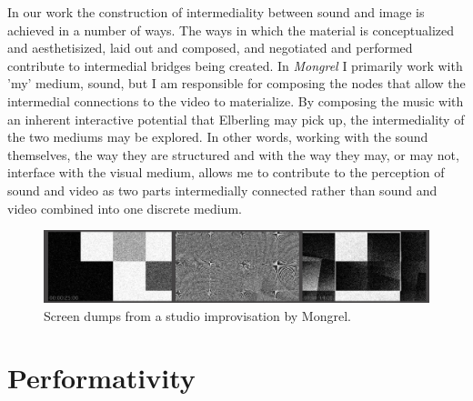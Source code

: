 \documentclass[11pt]{article}
\begin{document}
In our work the construction of intermediality between sound
and image is achieved in a number of ways. The ways in which the material is
conceptualized and aesthetisized, laid out and composed, and negotiated
and performed contribute to intermedial bridges being created. In \emph{Mongrel} I primarily work with 'my' medium,
sound, but I am responsible for composing the nodes that allow the
intermedial connections to the video to materialize. By composing the
music with an inherent interactive potential that Elberling may pick
up, the intermediality of the two mediums may be explored. In other
words, working with the sound themselves, the way they are structured
and with the way they may, or may not, interface with the visual
medium, allows me to contribute to the perception of sound and video
as two parts intermedially connected rather than sound and video
combined into one discrete medium. 







\begin{figure}\label{fig:impro-1}
  \centering
  \includegraphics[width=\linewidth]{img/impro-1.jpeg}
  \caption{Screen dumps from a studio improvisation by Mongrel.}
\end{figure}

\section*{Performativity}
\label{sec:performance}
\end{document}
